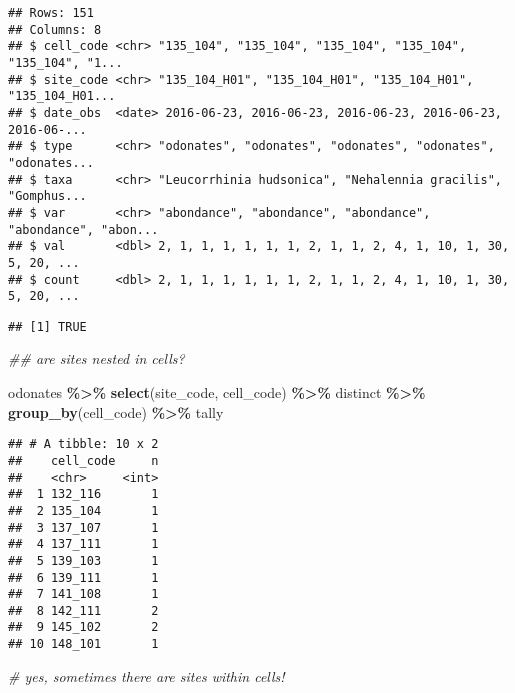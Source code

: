 \documentclass[
]{book}
\newenvironment{Shaded}{\begin{snugshade}}{\end{snugshade}}
\newcommand{\CommentTok}[1]{\textcolor[rgb]{0.56,0.35,0.01}{\textit{#1}}}
\newcommand{\KeywordTok}[1]{\textcolor[rgb]{0.13,0.29,0.53}{\textbf{#1}}}
\newcommand{\NormalTok}[1]{#1}
\newcommand{\OperatorTok}[1]{\textcolor[rgb]{0.81,0.36,0.00}{\textbf{#1}}}
\newcommand{\StringTok}[1]{\textcolor[rgb]{0.31,0.60,0.02}{#1}}
\begin{document}
\begin{verbatim}
## Rows: 151
## Columns: 8
## $ cell_code <chr> "135_104", "135_104", "135_104", "135_104", "135_104", "1...
## $ site_code <chr> "135_104_H01", "135_104_H01", "135_104_H01", "135_104_H01...
## $ date_obs  <date> 2016-06-23, 2016-06-23, 2016-06-23, 2016-06-23, 2016-06-...
## $ type      <chr> "odonates", "odonates", "odonates", "odonates", "odonates...
## $ taxa      <chr> "Leucorrhinia hudsonica", "Nehalennia gracilis", "Gomphus...
## $ var       <chr> "abondance", "abondance", "abondance", "abondance", "abon...
## $ val       <dbl> 2, 1, 1, 1, 1, 1, 1, 2, 1, 1, 2, 4, 1, 10, 1, 30, 5, 20, ...
## $ count     <dbl> 2, 1, 1, 1, 1, 1, 1, 2, 1, 1, 2, 4, 1, 10, 1, 30, 5, 20, ...
\end{verbatim}

\begin{verbatim}
## [1] TRUE
\end{verbatim}

\begin{Shaded}
\begin{Highlighting}[]
\CommentTok{\#\# are sites nested in cells? }

\NormalTok{odonates }\OperatorTok{\%\textgreater{}\%}\StringTok{ }
\StringTok{  }\KeywordTok{select}\NormalTok{(site\_code, cell\_code) }\OperatorTok{\%\textgreater{}\%}\StringTok{ }\NormalTok{distinct }\OperatorTok{\%\textgreater{}\%}\StringTok{ }
\StringTok{  }\KeywordTok{group\_by}\NormalTok{(cell\_code) }\OperatorTok{\%\textgreater{}\%}\StringTok{ }\NormalTok{tally}
\end{Highlighting}
\end{Shaded}

\begin{verbatim}
## # A tibble: 10 x 2
##    cell_code     n
##    <chr>     <int>
##  1 132_116       1
##  2 135_104       1
##  3 137_107       1
##  4 137_111       1
##  5 139_103       1
##  6 139_111       1
##  7 141_108       1
##  8 142_111       2
##  9 145_102       2
## 10 148_101       1
\end{verbatim}

\begin{Shaded}
\begin{Highlighting}[]
\CommentTok{\# yes, sometimes there are sites within cells!}
\end{Highlighting}
\end{Shaded}
\end{document}
